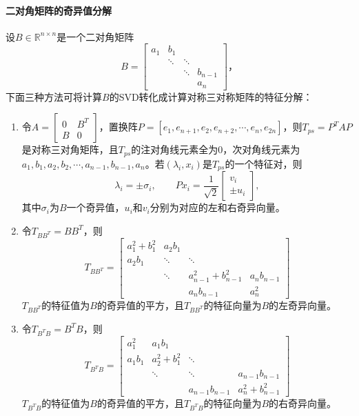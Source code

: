 \documentclass[UTF8]{article}
\begin{document}
\begin{flushleft}
\paragraph{二对角矩阵的奇异值分解}
设$B \in \mathbb{R}^{n \times n}$是一个二对角矩阵
$$
B=
\begin{bmatrix}
a_1 & b_1 &  &  \\
    & \ddots & \ddots &  \\
    &     & \ddots & b_{n-1} \\
    &     &        & a_n
\end{bmatrix}，
$$
下面三种方法可将计算$B$的SVD转化成计算对称三对称矩阵的特征分解：
\begin{enumerate}[(1)]
  \item 令$A=\begin{bmatrix}0 & B^T \\ B & 0\end{bmatrix}$，置换阵$P=[e_1,e_{n+1},e_2,e_{n+2},\cdots,e_n,e_{2n}]$，则$T_{ps}=P^TAP$是对称三对角矩阵，且$T_{ps}$的注对角线元素全为0，次对角线元素为$a_1,b_1,a_2,b_2,\cdots,a_{n-1},b_{n-1},a_n$。若$(\lambda_i,x_i)$是$T_{ps}$的一个特征对，则
      $$\lambda_i=\pm \sigma_i, \qquad Px_i=\frac{1}{\sqrt{2}}\begin{bmatrix}v_i \\ \pm u_i\end{bmatrix},$$
      其中$\sigma_i$为$B$一个奇异值，$u_i$和$v_i$分别为对应的左和右奇异向量。
  \item 令$T_{BB^T}=BB^T$，则
      $$
      T_{BB^T}=
      \begin{bmatrix}
      a_1^2+b_1^2 & a_2b_1 &        &          \\
      a_2b_1      & \ddots & \ddots &          \\
                  & \ddots & a_{n-1}^2+b_{n-1}^2 & a_nb_{n-1} \\
                  &        & a_nb_{n-1}          & a_n^2
      \end{bmatrix}
      $$
      $T_{BB^T}$的特征值为$B$的奇异值的平方，且$T_{BB^T}$的特征向量为$B$的左奇异向量。
  \item 令$T_{B^TB}=B^TB$，则
    $$
    T_{B^TB}=
      \begin{bmatrix}
      a_1^2 & a_1b_1 &        &          \\
      a_1b_1      & a_2^2+b_1^2 & \ddots &          \\
                  & \ddots & \ddots & a_{n-1}b_{n-1} \\
                  &        & a_{n-1}b_{n-1}          & a_n^2+b_{n-1}^2
      \end{bmatrix}
    $$
    $T_{B^TB}$的特征值为$B$的奇异值的平方，且$T_{B^TB}$的特征向量为$B$的右奇异向量。
\end{enumerate}


\end{flushleft}
\end{document}
